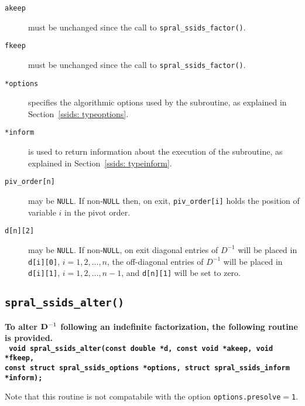 \begin{description}

\item[\texttt{akeep}] must be unchanged since the call to
   {\tt spral\_ssids\_factor()}.

\item[\texttt{fkeep}] must be unchanged since the call to
   {\tt spral\_ssids\_factor()}.

\item[\texttt{*options}] specifies the algorithmic options used by the
   subroutine, as explained in Section~\ref{ssids: typeoptions}.

\item[\texttt{*inform}] is used to return information about the execution
   of the subroutine, as explained in Section~\ref{ssids: typeinform}.

\item[\texttt{piv\_order[n]}] may be \texttt{NULL}. If non-\texttt{NULL}
   then, on exit, \texttt{piv\_order[i]}
   holds the position of variable $i$ in the pivot order.

\item[\texttt{d[n][2]}] may be \texttt{NULL}.
   If non-\texttt{NULL}, on exit diagonal entries of ${D}^{-1}$ will be placed
   in {\tt d[i][0]}, $i = 1,2,\ldots,n$, the off-diagonal entries of ${D}^{-1}$
   will be placed in {\tt d[i][1]}, $i = 1,2,\ldots,n-1$, and {\tt d[n][1]}
   will be set to zero.

\end{description}



\subsection{\texttt{spral\_ssids\_alter()}}
\textbf{To alter ${\bf D}^{-1}$ following an indefinite factorization,
   the following routine is provided.
   \vspace*{0.1cm} \\
   \texttt{
      \hspace*{0.2cm} void spral\_ssids\_alter(const double *d, const void *akeep, void *fkeep, \\
      \hspace*{0.7cm} const struct spral\_ssids\_options *options,
         struct spral\_ssids\_inform *inform);
   }
}

\vspace{0.3cm}
\noindent
Note that this routine is not compatabile with the option \texttt{options.presolve}$=$\texttt{1}.

